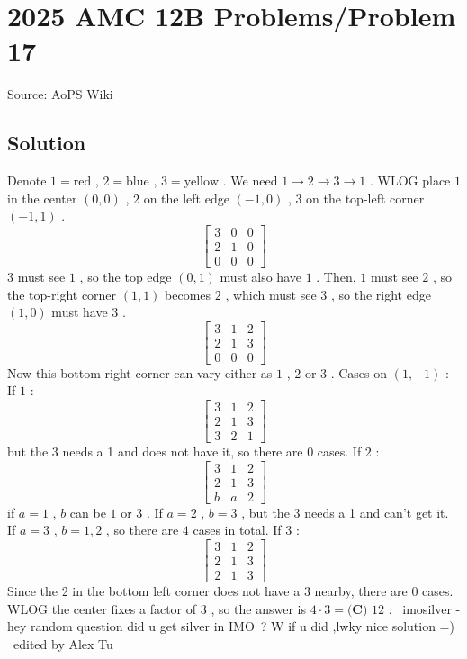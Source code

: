 \documentclass[12pt]{article}
\begin{document}
\section*{{2025 AMC 12B Problems/Problem 17}}
Source: AoPS Wiki

\subsection*{Solution}
Denote $1=\text{red}$ , $2=\text{blue}$ , $3=\text{yellow}$ . We need $1\to 2\to 3\to 1$ . WLOG place $1$ in the center $(0,0)$ , $2$ on the left edge $(-1,0)$ , $3$ on the top-left corner $(-1,1)$ . \[\begin{bmatrix} 3 & 0 & 0 \\ 2 & 1 & 0 \\ 0 & 0 & 0 \end{bmatrix}\] $3$ must see $1$ , so the top edge $(0,1)$ must also have $1$ . Then, $1$ must see $2$ , so the top-right corner $(1,1)$ becomes $2$ , which must see $3$ , so the right edge $(1,0)$ must have $3$ . \[\begin{bmatrix} 3 & 1 & 2 \\ 2 & 1 & 3 \\ 0 & 0 & 0 \end{bmatrix}\] Now this bottom-right corner can vary either as $1$ , $2$ or $3$ .
Cases on $(1,-1)$ :
If $1$ : \[\begin{bmatrix} 3 & 1 & 2 \\ 2 & 1 & 3 \\ 3 & 2 & 1 \end{bmatrix}\] but the 3 needs a 1 and does not have it, so there are $0$ cases.
If $2$ : \[\begin{bmatrix} 3 & 1 & 2 \\ 2 & 1 & 3 \\ b & a & 2 \end{bmatrix}\] if $a=1$ , $b$ can be $1$ or $3$ . If $a=2$ , $b=3$ , but the 3 needs a 1 and can't get it.
If $a=3$ , $b=1,2$ , so there are $4$ cases in total.
If $3$ : \[\begin{bmatrix} 3 & 1 & 2 \\ 2 & 1 & 3 \\ 2 & 1 & 3 \end{bmatrix}\] Since the 2 in the bottom left corner does not have a 3 nearby, there are $0$ cases. WLOG the center fixes a factor of $3$ , so the answer is $4\cdot 3=\boxed{\textbf{(C) } 12}$ . ~imosilver
- hey random question did u get silver in IMO ? W if u did ,lwky nice solution =)
~edited by Alex Tu
\end{document}
